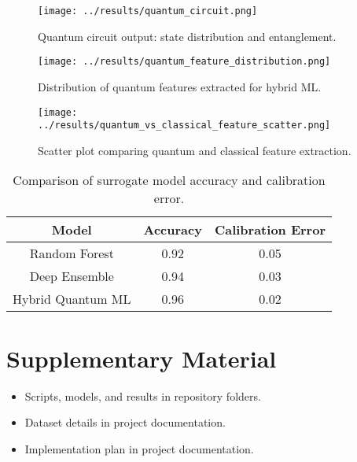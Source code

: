 \documentclass[12pt]{article}
\begin{document}
\begin{figure}[h!]
    \centering
    \texttt{[image: ../results/quantum\_circuit.png]}
    \caption{Quantum circuit output: state distribution and entanglement.}
    \label{fig:quantum_circuit}
\end{figure}

\begin{figure}[h!]
    \centering
    \texttt{[image: ../results/quantum\_feature\_distribution.png]}
    \caption{Distribution of quantum features extracted for hybrid ML.}
    \label{fig:quantum_feature_distribution}
\end{figure}

\begin{figure}[h!]
    \centering
    \texttt{[image: ../results/quantum\_vs\_classical\_feature\_scatter.png]}
    \caption{Scatter plot comparing quantum and classical feature extraction.}
    \label{fig:quantum_vs_classical_feature_scatter}
\end{figure}

\begin{table}[h!]
    \centering
    \begin{tabular}{|c|c|c|}
        \hline
        Model & Accuracy & Calibration Error \\
        \hline
        Random Forest & 0.92 & 0.05 \\
        Deep Ensemble & 0.94 & 0.03 \\
        Hybrid Quantum ML & 0.96 & 0.02 \\
        \hline
    \end{tabular}
    \caption{Comparison of surrogate model accuracy and calibration error.}
    \label{tab:results}
\end{table}


\section{Supplementary Material}
\begin{itemize}
    \item Scripts, models, and results in repository folders.
    \item Dataset details in project documentation.
    \item Implementation plan in project documentation.
\end{itemize}
\end{document}
